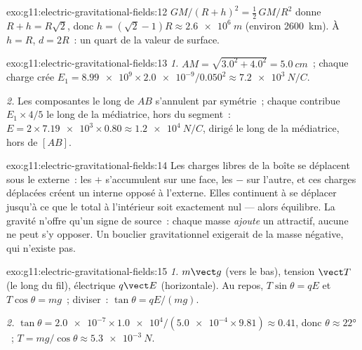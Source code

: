 \begin{solution}{exo:g11:electric-gravitational-fields:12}
$GM/(R+h)^2 = \tfrac12\,GM/R^2$ donne $R + h = R\sqrt{2}$, donc
$h = (\sqrt{2} - 1)R \approx \qty{2.6e6}{m}$ (environ \qty{2600}{km}). À
$h = R$, $d = 2R$~: un quart de la valeur de surface.
\end{solution}

\begin{solution}{exo:g11:electric-gravitational-fields:13}
\emph{1.} $AM = \sqrt{3.0^2 + 4.0^2} = \qty{5.0}{cm}$~; chaque charge
crée $E_1 = \num{8.99e9} \times \num{2.0e-9} / 0.050^2
\approx \qty{7.2e3}{N/C}$.

\emph{2.} Les composantes le long de $AB$ s'annulent par symétrie~;
chaque  contribue
$E_1 \times 4/5$ le long de la médiatrice, hors du segment~:
$E = 2 \times \num{7.19e3} \times 0.80 \approx \qty{1.2e4}{N/C}$,
dirigé le long de la médiatrice, hors de $[AB]$.
\end{solution}

\begin{solution}{exo:g11:electric-gravitational-fields:14}
Les charges libres de la boîte se déplacent sous le
 externe~: les $+$ s'accumulent
sur une face, les $-$ sur l'autre, et ces charges déplacées créent un
 interne opposé à l'externe. Elles
continuent à se déplacer jusqu'à ce que le
 total à l'intérieur soit
exactement nul --- alors équilibre. La gravité n'offre qu'un signe de
source~: chaque masse \emph{ajoute} un
 attractif, aucune ne peut s'y
opposer. Un bouclier gravitationnel exigerait de la masse négative, qui
n'existe pas.
\end{solution}

\begin{solution}{exo:g11:electric-gravitational-fields:15}
\emph{1.}  $m\vect g$ (vers le bas),
tension $\vect T$ (le long du fil),
 électrique $q\vect E$
(horizontale). Au repos, $T\sin\theta = qE$ et $T\cos\theta = mg$~;
diviser~: $\tan\theta = qE/(mg)$.

\emph{2.} $\tan\theta = \num{2.0e-7} \times \num{1.0e4} /
(\num{5.0e-4} \times 9.81) \approx 0.41$, donc $\theta \approx \ang{22}$~;
$T = mg/\cos\theta \approx \qty{5.3e-3}{N}$.
\end{solution}

